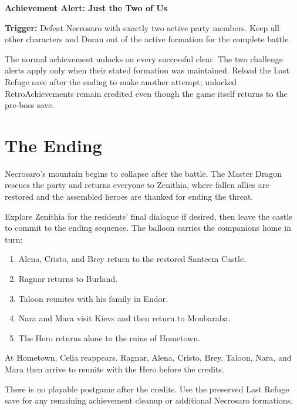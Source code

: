 \documentclass[
  american,
  10pt,
  letterpaper,
  oneside,
  open=any]{scrreprt}
\providecommand{\tightlist}{%
  \setlength{\itemsep}{0pt}\setlength{\parskip}{0pt}}
\begin{document}
\begin{achievementalert}

\textbf{Achievement Alert: Just the Two of Us}

\textbf{Trigger:} Defeat Necrosaro with exactly two active party
members. Keep all other characters and Doran out of the active formation
for the complete battle.

\end{achievementalert}

The normal achievement unlocks on every successful clear. The two
challenge alerts apply only when their stated formation was maintained.
Reload the Last Refuge save after the ending to make another attempt;
unlocked RetroAchievements remain credited even though the game itself
returns to the pre-boss save.

\section{The Ending}\label{the-ending}

Necrosaro's mountain begins to collapse after the battle. The Master
Dragon rescues the party and returns everyone to Zenithia, where fallen
allies are restored and the assembled heroes are thanked for ending the
threat.

Explore Zenithia for the residents' final dialogue if desired, then
leave the castle to commit to the ending sequence. The balloon carries
the companions home in turn:

\begin{enumerate}
\def\labelenumi{\arabic{enumi}.}
\tightlist
\item
  Alena, Cristo, and Brey return to the restored Santeem Castle.
\item
  Ragnar returns to Burland.
\item
  Taloon reunites with his family in Endor.
\item
  Nara and Mara visit Kievs and then return to Monbaraba.
\item
  The Hero returns alone to the ruins of Hometown.
\end{enumerate}

At Hometown, Celia reappears. Ragnar, Alena, Cristo, Brey, Taloon, Nara,
and Mara then arrive to reunite with the Hero before the credits.

There is no playable postgame after the credits. Use the preserved Last
Refuge save for any remaining achievement cleanup or additional
Necrosaro formations.
\end{document}
